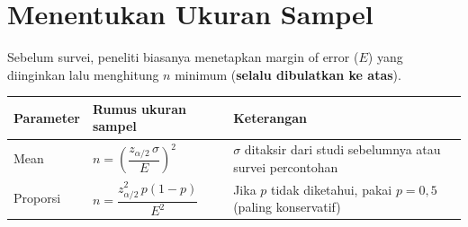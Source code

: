 \documentclass[
  indonesian,
  letterpaper,
]{book}
\newcounter{none} %
\begin{document}

\chapter{Menentukan Ukuran Sampel}\label{menentukan-ukuran-sampel}

Sebelum survei, peneliti biasanya menetapkan margin of error (\(E\))
yang diinginkan lalu menghitung \(n\) minimum (\textbf{selalu dibulatkan
ke atas}).

{\def\LTcaptype{none} %
\begin{longtable}[]{@{}
  >{\raggedright\arraybackslash}p{}
  >{\centering\arraybackslash}p{}
  >{\raggedright\arraybackslash}p{}@{}}
\toprule\noalign{}
\begin{minipage}[b]{\linewidth}\raggedright
Parameter
\end{minipage} & \begin{minipage}[b]{\linewidth}\centering
Rumus ukuran sampel
\end{minipage} & \begin{minipage}[b]{\linewidth}\raggedright
Keterangan
\end{minipage} \\
\midrule\noalign{}
\endhead
\bottomrule\noalign{}
\endlastfoot
Mean & \(n = \left(\dfrac{z_{\alpha/2}\,\sigma}{E}\right)^2\) &
\(\sigma\) ditaksir dari studi sebelumnya atau survei percontohan \\
Proporsi & \(n = \dfrac{z_{\alpha/2}^2\, p(1-p)}{E^2}\) & Jika \(p\)
tidak diketahui, pakai \(p = 0{,}5\) (paling konservatif) \\
\end{longtable}
}
\end{document}

